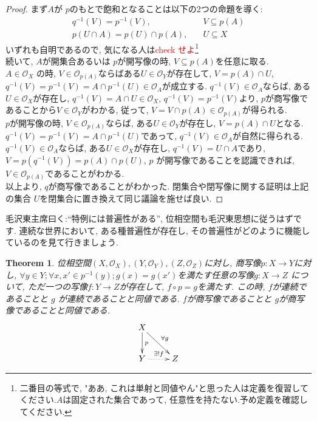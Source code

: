 \documentclass[lualatex]{ltjsbook}
\newtheorem{theorem}{Theorem}[chapter]
\theoremstyle{remark}
\theoremstyle{plain}
\begin{document}
\begin{proof}%
	まず$A$が $p$のもとで飽和となることは以下の2つの命題を導く:
	 \[
	\begin{aligned}%
		q^{-1}(V) = p ^{-1}(V),  \quad & V \subseteq p(A)\\
		p(U\cap A) = p(U) \cap p(A),  \quad & U\subseteq X 
	\end{aligned}
	\]
	いずれも自明であるので,  気になる人は\textcolor{red}{check せよ}\footnote{二番目の等式で,  "ああ, これは単射と同値やん"と思った人は定義を復習してください.$A$は固定された集合であって, 任意性を持たない.予め定義を確認してください.}\\
	続いて,  $A$が開集合あるいは $p$が開写像の時,   $V \subseteq p(A)$を任意に取る.\\
	$A \in \mathcal{O}_X$ の時,  $V \in \mathcal{O}_{p(A)}$ならばある$U \in \mathcal{O}_Y $が存在して,  
	$V = p(A) \cap U$,  $q^{-1}(V) = p ^{-1}(V) = A \cap p^{-1}(U) \in \mathcal{O}_A$が成立する. 
	$q^{-1}(V) \in \mathcal{O}_A$ならば,  ある$U \in \mathcal{O}_X$が存在し,  
	$q^{-1}(V) = A \cap U \in \mathcal{O}_X$,  $q^{-1}(V) = p ^{-1}(V)$より,  
	$p$が商写像であることから$V \in \mathcal{O}_Y$がわかる,  従って,  $V =V \cap p(A)\in \mathcal{O}_{p(A)}$が得られる. \\
	$p$が開写像の時,   $V \in \mathcal{O}_{p(A)}$ならば,  ある$U \in \mathcal{O}_Y$が存在し,  
	$V = p(A) \cap U$となる. 
	$q^{-1}(V) = p ^{-1}(V) = A \cap p ^{-1}(U)$であって,  
	$q^{-1}(V) \in \mathcal{O}_A$が自然に得られる. 
	$q^{-1}(V) \in \mathcal{O}_A$ならば,  ある$U \in \mathcal{O}_X$が存在し, 
	$q^{-1} (V) =U \cap A$であり,  $V=p(q^{-1}(V)) = p(A) \cap p(U)$,  
	$p$ が開写像であることを認識できれば,  $V \in \mathcal{O}_{p(A)}$であることがわかる.\\
	以上より,  $q$が商写像であることがわかった. 閉集合や閉写像に関する証明は上記の集合 $U$を閉集合に置き換えて同じ議論を施せば良い.
\end{proof}

毛沢東主席曰く:“特例には普遍性がある”,  位相空間も毛沢東思想に従うはずです. 連続な世界において,  ある種普遍性が存在し,  その普遍性がどのように機能しているのを見て行きましょう.

\begin{theorem}%
	位相空間$\left( X,  \mathcal{O}_X \right) , \left( Y, \mathcal{O}_Y \right) ,  \left( Z ,  \mathcal{O}_Z\right) $に対し,  商写像$p: X \to Y$に対し,  $\forall y \in Y; \forall x , x'\in p ^{-1}({y});g(x)=g(x')$を満たす任意の写像$g: X \to Z$ について,  ただ一つの写像$f: Y\to Z$が存在して,  $f \circ p = g$を満たす. この時,   $f$が連続であることと $g$ が連続であることと同値である. $f$が商写像であることと $g$が商写像であることと同値である.
\[
	\xymatrix{
		X \ar[d]^{p} \ar[rd]^{\forall g} \\
		Y \ar@{..>}[r]^{\exists !f} &Z
	}
\] 		
\end{theorem}
\end{document}
